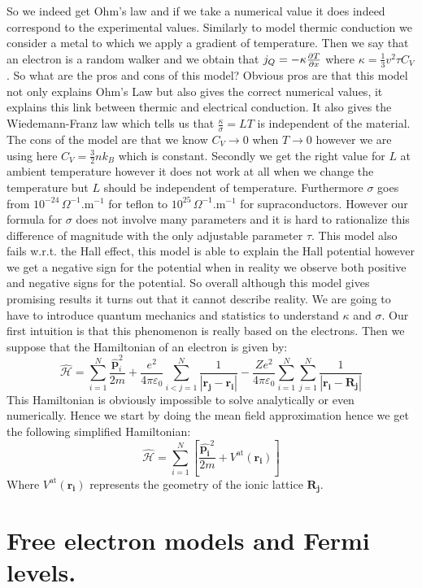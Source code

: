 \documentclass[10pt,a4paper]{book}
\begin{document}
So we indeed get Ohm's law and if we take a numerical value it does indeed correspond to the experimental values. Similarly to model thermic conduction we consider a metal to which we apply a gradient of temperature. Then we say that an electron is a random walker and we obtain that $j_Q = - \kappa \pdv{T}{x}$ where $\kappa = \frac{1}{3} v^2 \tau C_V$. So what are the pros and cons of this model? Obvious pros are that this model not only explains Ohm's Law but also gives the correct numerical values, it explains this link between thermic and electrical conduction. It also gives the Wiedemann-Franz law which tells us that $\frac{\kappa}{\sigma} = L T$ is independent of the material. The cons of the model are that we know $C_V \to 0$ when $T \to 0$ however we are using here $C_V = \frac{3}{2} n k_B$ which is constant. Secondly we get the right value for $L$ at ambient temperature however it does not work at all when we change the temperature but $L$ should be independent of temperature. Furthermore $\sigma$ goes from $10^{-24} \,\Omega^{-1}.\text{m}^{-1}$ for teflon to $10^{25}  \,\Omega^{-1}.\text{m}^{-1}$ for supraconductors. However our formula for $\sigma$ does not involve many parameters and it is hard to rationalize this difference of magnitude with the only adjustable parameter $\tau$. This model also fails w.r.t. the Hall effect, this model is able to explain the Hall potential however we get a negative sign for the potential when in reality we observe both positive and negative signs for the potential. So overall although this model gives promising results it turns out that it cannot describe reality. We are going to have to introduce quantum mechanics and statistics to understand $\kappa$ and $\sigma$. Our first intuition is that this phenomenon is really based on the electrons. Then we suppose that the Hamiltonian of an electron is given by:
\[
\hat{\mathcal{H}} = \sum_{i = 1}^N \frac{\hat{\mathbf{p}}_i^2}{2m} + \frac{e^2}{4 \pi \varepsilon_0} \sum_{i < j = 1}^N \frac{1}{|\mathbf{r_j} - \mathbf{r_i}|} - \frac{Ze^2}{4 \pi \varepsilon_0} \sum_{i = 1}^N \sum_{j = 1}^N \frac{1}{|\mathbf{r_i} - \mathbf{R_j}|}
\]
This Hamiltonian is obviously impossible to solve analytically or even numerically. Hence we start by doing the mean field approximation hence we get the following simplified Hamiltonian:
\[
\hat{\mathcal{H}} = \sum_{i = 1}^N \left[ \frac{\hat{\mathbf{p_i}}^2}{2m} + V^\text{at}(\mathbf{r_i})  \right]
\]
Where $V^\text{at}(\mathbf{r_i})$ represents the geometry of the ionic lattice $\mathbf{R_j}$.

\chapter{Free electron models and Fermi levels.}
\end{document}
